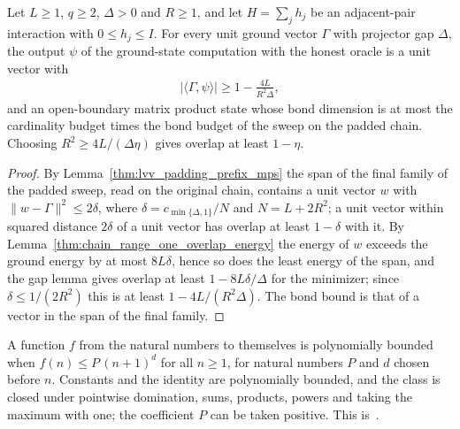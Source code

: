 \begin{theorem}
    \label{thm:lvv_ground_state_program_spec}
    \leanok
    Let $L\ge1$, $q\ge2$, $\Delta>0$ and $R\ge1$, and let $H=\sum_j h_j$ be an
    adjacent-pair interaction with $0\le h_j\le I$. For every unit ground
    vector $\Gamma$ with projector gap $\Delta$, the output $\psi$ of the
    ground-state computation with the honest oracle is a unit vector with
    \begin{align}
        |\langle\Gamma,\psi\rangle|\ge1-\frac{4L}{R^2\Delta},
    \end{align}
    and an open-boundary matrix product state whose bond dimension is at most
    the cardinality budget times the bond budget of the sweep on the padded
    chain. Choosing $R^2\ge4L/(\Delta\eta)$ gives overlap at least $1-\eta$.
\end{theorem}
\begin{proof}
    \leanok
    By Lemma~\ref{thm:lvv_padding_prefix_mps} the span of the final family of
    the padded sweep, read on the original chain, contains a unit vector $w$
    with $\|w-\Gamma\|^2\le2\delta$, where $\delta=c_{\min\{\Delta,1\}}/N$ and
    $N=L+2R^2$; a unit vector within squared distance $2\delta$ of a unit
    vector has overlap at least $1-\delta$ with it. By
    Lemma~\ref{thm:chain_range_one_overlap_energy} the energy of $w$ exceeds the
    ground energy by at most $8L\delta$, hence so does the least energy of the
    span, and the gap lemma gives overlap at least $1-8L\delta/\Delta$ for the
    minimizer; since $\delta\le1/(2R^2)$ this is at least $1-4L/(R^2\Delta)$.
    The bond bound is that of a vector in the span of the final family.
\end{proof}

\begin{definition}
    \label{def:nat_polynomial_bounded}
    \leanok
    A function $f$ from the natural numbers to themselves is polynomially
    bounded when $f(n)\le P\,(n+1)^d$ for all $n\ge1$, for natural numbers $P$
    and $d$ chosen before $n$. Constants and the identity are polynomially
    bounded, and the class is closed under pointwise domination, sums,
    products, powers and taking the maximum with one; the coefficient $P$ can be
    taken positive.
    This is~\cite[``Polynomially bounded functions'']{QICLean2026Blueprint}.
\end{definition}


